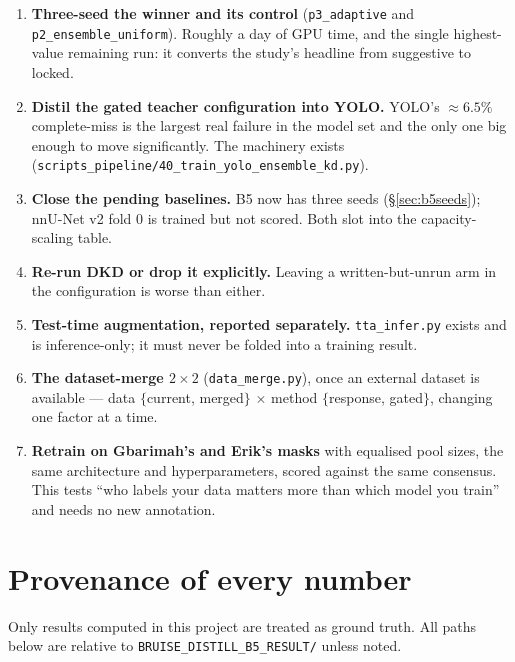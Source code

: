 \documentclass[11pt]{article}
\begin{document}
\begin{enumerate}[leftmargin=1.7em,itemsep=4pt]
  \item \textbf{Three-seed the winner and its control} (\texttt{p3\_adaptive} and
  \texttt{p2\_ensemble\_uniform}). Roughly a day of GPU time, and the single highest-value
  remaining run: it converts the study's headline from suggestive to locked.

  \item \textbf{Distil the gated teacher configuration into YOLO.} YOLO's $\approx6.5\%$
  complete-miss is the largest real failure in the model set and the only one big enough to move
  significantly. The machinery exists
  (\texttt{scripts\_pipeline/40\_train\_yolo\_ensemble\_kd.py}).

  \item \textbf{Close the pending baselines.} B5 now has three seeds (\S\ref{sec:b5seeds});
  nnU-Net v2 fold 0 is trained but not scored. Both slot into the capacity-scaling table.

  \item \textbf{Re-run DKD or drop it explicitly.} Leaving a written-but-unrun arm in the
  configuration is worse than either.

  \item \textbf{Test-time augmentation, reported separately.} \texttt{tta\_infer.py} exists and is
  inference-only; it must never be folded into a training result.

  \item \textbf{The dataset-merge $2\times2$} (\texttt{data\_merge.py}), once an external dataset
  is available --- data $\{$current, merged$\}$ $\times$ method $\{$response, gated$\}$, changing
  one factor at a time.

  \item \textbf{Retrain on Gbarimah's and Erik's masks} with equalised pool sizes, the same
  architecture and hyperparameters, scored against the same consensus. This tests ``who labels
  your data matters more than which model you train'' and needs no new annotation.
\end{enumerate}

\appendix
\section{Provenance of every number}

Only results computed in this project are treated as ground truth. All paths below are relative to
\texttt{BRUISE\_DISTILL\_B5\_RESULT/} unless noted.
\end{document}
